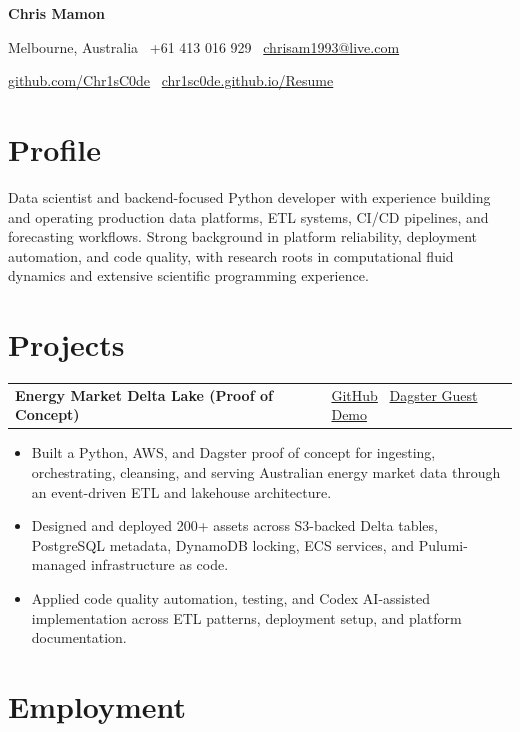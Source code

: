 \documentclass[10pt,a4paper]{article}
\makeatletter
\newcommand{\resumeheader}[4]{
  {\huge\textbf{\textcolor{textdark}{#1}}}\par
  \textcolor{mutedtext}{#2 \textbar\ #3 \textbar\ \href{mailto:#4}{#4}}\par
  \textcolor{mutedtext}{\href{https://github.com/Chr1sC0de/}{github.com/Chr1sC0de}
  \textbar\
  \href{https://chr1sc0de.github.io/Resume/}{chr1sc0de.github.io/Resume}}\par
}
\newcommand{\resumesection}[1]{\section*{#1}}
\newcommand{\resumeproject}[2]{
  \par\addvspace{0.2em}
  \noindent\begin{tabularx}{\textwidth}{@{}>{\raggedright\arraybackslash}X>{\raggedleft\arraybackslash}p{0.36\textwidth}@{}}
    \textbf{\textcolor{textdark}{#1}} & #2
  \end{tabularx}
  \vspace{-0.55em}
}
\makeatother
\begin{document}
\resumeheader{Chris Mamon}{Melbourne, Australia}{+61 413 016 929}{chrisam1993@live.com}

\resumesection{Profile}
Data scientist and backend-focused Python developer with experience building and operating production data platforms, ETL systems, CI/CD pipelines, and forecasting workflows. Strong background in platform reliability, deployment automation, and code quality, with research roots in computational fluid dynamics and extensive scientific programming experience.

\resumesection{Projects}
\resumeproject{Energy Market Delta Lake (Proof of Concept)}{\href{https://github.com/Chr1sC0de/energy-market-delta-lake}{GitHub} \textbar\ \href{https://ausenergymarketdata.com/dagster-webserver/guest}{Dagster Guest Demo}}
\begin{itemize}
  \item Built a Python, AWS, and Dagster proof of concept for ingesting, orchestrating, cleansing, and serving Australian energy market data through an event-driven ETL and lakehouse architecture.
  \item Designed and deployed 200+ assets across S3-backed Delta tables, PostgreSQL metadata, DynamoDB locking, ECS services, and Pulumi-managed infrastructure as code.
  \item Applied code quality automation, testing, and Codex AI-assisted implementation across ETL patterns, deployment setup, and platform documentation.
\end{itemize}

\resumesection{Employment}
\end{document}
